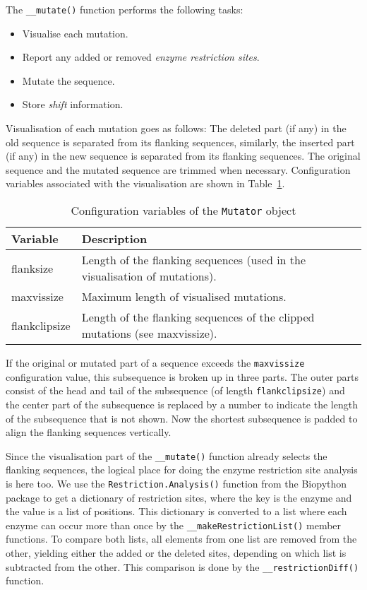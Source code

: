 \documentclass{article}
\begin{document}
The \texttt{\_\_mutate()} function performs the following tasks:
\begin{itemize}
\item Visualise each mutation.
\item Report any added or removed \emph{enzyme restriction sites}.
\item Mutate the sequence.
\item Store \emph{shift} information.
\end{itemize}

Visualisation of each mutation goes as follows: The deleted part (if any) in
the old sequence is separated from its flanking sequences, similarly, the
inserted part (if any) in the new sequence is separated from its flanking
sequences. The original sequence and the mutated sequence are trimmed when
necessary. Configuration variables associated with the visualisation are
shown in Table~\ref{tab:mutatorconfig}.

\begin{table}[H]
\begin{center}
\begin{tabular}{l|p{9cm}}
Variable      & Description \\
\hline
flanksize     & Length of the flanking sequences (used in the visualisation of
                mutations). \\
maxvissize    & Maximum length of visualised mutations. \\
flankclipsize & Length of the flanking sequences of the clipped mutations (see
                maxvissize).
\end{tabular}
\caption{Configuration variables of the \texttt{Mutator} object}
\label{tab:mutatorconfig}
\end{center}
\end{table}

If the original or mutated part of a sequence exceeds the \texttt{maxvissize}
configuration value, this subsequence is broken up in three parts. The outer
parts consist of the head and tail of the subsequence (of length
\texttt{flankclipsize}) and the center part of the subsequence is replaced by
a number to indicate the length of the subsequence that is not shown. Now the
shortest subsequence is padded to align the flanking sequences vertically.

Since the visualisation part of the \texttt{\_\_mutate()} function already
selects the flanking sequences, the logical place for doing the enzyme
restriction site analysis is here too. We use the
\texttt{Restriction.Analysis()} function from the Biopython package to get a
dictionary of restriction sites, where the key is the enzyme and the value is a
list of positions. This dictionary is converted to a list where each enzyme can
occur more than once by the \texttt{\_\_makeRestrictionList()} member
functions. To compare both lists, all elements from one list are removed from
the other, yielding either the added or the deleted sites, depending on which
list is subtracted from the other. This comparison is done by the
\texttt{\_\_restrictionDiff()} function.
\end{document}
